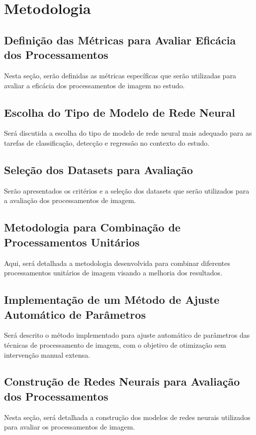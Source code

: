 \chapter{Metodologia}
\section{Definição das Métricas para Avaliar Eficácia dos Processamentos}
Nesta seção, serão definidas as métricas específicas que serão utilizadas para avaliar a eficácia dos processamentos de imagem no estudo.

\section{Escolha do Tipo de Modelo de Rede Neural}
Será discutida a escolha do tipo de modelo de rede neural mais adequado para as tarefas de classificação, detecção e regressão no contexto do estudo.

\section{Seleção dos Datasets para Avaliação}
Serão apresentados os critérios e a seleção dos datasets que serão utilizados para a avaliação dos processamentos de imagem.

\section{Metodologia para Combinação de Processamentos Unitários}
Aqui, será detalhada a metodologia desenvolvida para combinar diferentes processamentos unitários de imagem visando a melhoria dos resultados.

\section{Implementação de um Método de Ajuste Automático de Parâmetros}
Será descrito o método implementado para ajuste automático de parâmetros das técnicas de processamento de imagem, com o objetivo de otimização sem intervenção manual extensa.

\section{Construção de Redes Neurais para Avaliação dos Processamentos}
Nesta seção, será detalhada a construção dos modelos de redes neurais utilizados para avaliar os processamentos de imagem.

